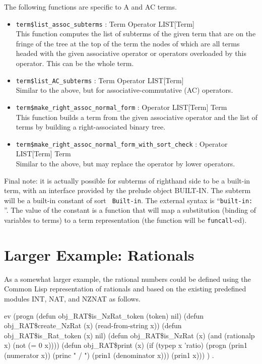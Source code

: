 The following functions are specific to A and AC terms.
\begin{itemize}
\item {\tt term\$list\_assoc\_subterms} : Term Operator \ra LIST[Term]\\
This function computes the list of subterms of the given term that
are on the fringe of the tree at the top of the term the nodes of
which are all terms headed with the given associative operator
or operators overloaded by this operator.  This can be the whole term.
\item {\tt term\$list\_AC\_subterms} : Term Operator \ra LIST[Term]\\
Similar to the above, but for associative-commutative (AC) operators.
\item {\tt term\$make\_right\_assoc\_normal\_form} : Operator LIST[Term] \ra Term\\
This function builds a term from the given associative operator and the
list of terms by building a right-associated binary tree.
\item {\tt term\$make\_right\_assoc\_normal\_form\_with\_sort\_check} : Operator LIST[Term] \ra Term\\
Similar to the above, but may replace the operator by lower operators.
\end{itemize}

Final note: it is actually possible for subterms of righthand side to
be a built-in term, with an interface provided by the prelude object
BUILT-IN.  The subterm will be a built-in constant of sort {\tt
Built-in}.  The external syntax is ``{\tt built-in:} ''.
The value of the constant is a function that will map a substitution
(binding of variables to terms) to a term representation (the function
will be {\tt funcall}-ed).

\section {Larger Example: Rationals}

As a somewhat larger example, the rational numbers could be 
defined using the Common Lisp representation of rationals
and based on the existing predefined modules INT, NAT, and NZNAT
as follows.

\bobj
ev (progn
(defun obj_RAT\$is_NzRat_token (token) nil)
(defun obj_RAT\$create_NzRat (x) (read-from-string x))
(defun obj_RAT\$is_Rat_token (x) nil)
(defun obj_RAT\$is_NzRat (x) (and (rationalp x) (not (= 0 x))))
(defun obj_RAT\$print (x)
  (if (typep x 'ratio)
    (progn
        (prin1 (numerator x))
        (princ " / ")
        (prin1 (denominator x)))
    (prin1 x)))
) .

